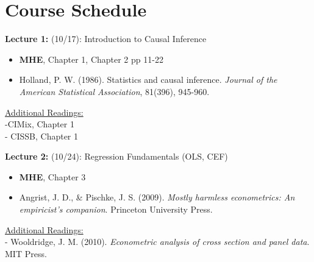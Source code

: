 \documentclass[12pt]{article}
\begin{document}
\section*{Course Schedule}

\vspace{2em}
\noindent\textbf{Lecture 1:} (10/17): Introduction to Causal Inference \\
\vspace{1em}
\begin{itemize}
    \item \textbf{MHE}, Chapter 1, Chapter 2 pp 11-22
    \item Holland, P. W. (1986). Statistics and causal inference. \textit{Journal of the American Statistical Association}, 81(396), 945-960.
\end{itemize}
\vspace{1em}
\underline{Additional Readings:} \\
\hspace{1em} -CIMix, Chapter 1 \\
\hspace{1em} - CISSB, Chapter 1

\vspace{2em}
\noindent\textbf{Lecture 2:} (10/24): Regression Fundamentals (OLS, CEF) \\
\vspace{1em}
\begin{itemize}
    \item \textbf{MHE}, Chapter 3
    \item Angrist, J. D., \& Pischke, J. S. (2009). \textit{Mostly harmless econometrics: An empiricist's companion}. Princeton University Press.
\end{itemize}
\vspace{1em}
\underline{Additional Readings:} \\
\hspace{1em} - Wooldridge, J. M. (2010). \textit{Econometric analysis of cross section and panel data}. MIT Press.
\end{document}
